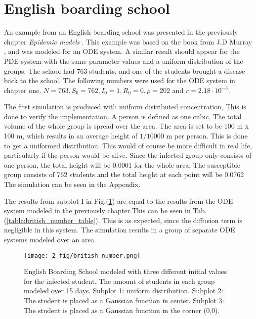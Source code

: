\documentclass[%
twoside,                 %
final,                   %
chapterprefix=true,      %
open=right               %
10pt]{book}
\begin{document}
\section{English boarding school}
\label{section:2_english}
An example from an English boarding school was presented in the previously chapter \emph{Epidemic models} . This example was based on the book from J.D Murray \cite{murray2002mathematical}, and was modeled for an ODE system. A similar result should appear for the PDE system with the same parameter values and a uniform distribution of the groups. The school had 763 students, and one of the students brought a disease back to the school. The following numbers were used for the ODE system in chapter one. $N=763, S_0=762,I_0=1,R_0=0,\rho=202$ and $r = 2.18\cdot 10^{-3}$. 


\vspace{3mm}




\vspace{3mm}


The first simulation is produced with uniform distributed concentration, This is done to verify the implementation. A person is defined as one cubic. The total volume of the whole group is spread over the area. The area is set to be 100 m x 100 m, which results in an average height of $1/10000$ m per person. This is done to get a uniformed distribution. This would of course be more difficult in real life, particularly if the person would be alive. Since the infected group only consists of one person, the total height will be 0.0001 for the whole area. The susceptible group consists of 762 students and the total height at each point will be 0.0762 The simulation can be seen in the Appendix. 


\vspace{3mm}




\vspace{3mm}


The results from subplot I in Fig.(\ref{fig:british_number}) are equal to the results from the ODE system modeled in the previously chapter.This can be seen in Tab.(\ref{table:british_number_table}). This is as expected, since the diffusion term is negligible in this system. The simulation results in a group of separate ODE systems modeled over an area.


\begin{figure}[ht]
  \centerline{\texttt{[image: 2\_fig/british\_number.png]}}
  \caption{
  \label{fig:british_number} English Boarding School modeled with three different initial values for the infected student. The amount of students in each group modeled over 15 days. Subplot 1: uniform distribution. Subplot 2: The student is placed as a Gaussian function in center. Subplot 3: The student is placed as a Gaussian function in the corner (0,0).
  }
\end{figure}
\end{document}
